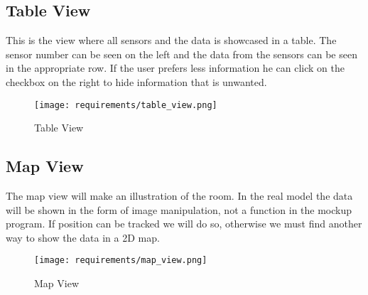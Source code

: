 \documentclass[../document]{subfiles}
\begin{document}
\newpage

\subsection{Table View}
This is the view where all sensors and the data is showcased in a table. The sensor number can be seen on the left and the data from the sensors can be seen in the appropriate row. If the user prefers less information he can click on the checkbox on the right to hide information that is unwanted.

\begin{figure}[H]
\centering
\texttt{[image: requirements/table\_view.png]}
\caption{Table View}
\end{figure}

\newpage

\subsection{Map View}
The map view will make an illustration of the room. In the real model the data will be shown in the form of image manipulation, not a function in the mockup program. If position can be tracked we will do so, otherwise we must find another way to show the data in a 2D map.

\begin{figure}[H]
\centering
\texttt{[image: requirements/map\_view.png]}
\caption{Map View}
\end{figure}
\end{document}
